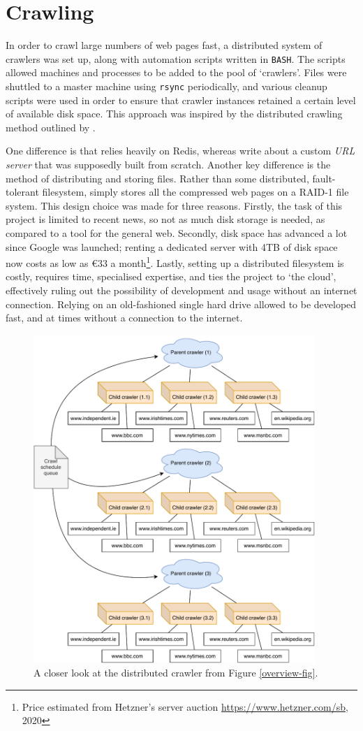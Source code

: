 \section{Crawling\label{crawling}}
In order to crawl large numbers of web pages fast, a
distributed system of crawlers was set up, along with
automation scripts written in {\tt BASH}. The scripts allowed
machines and processes to be added to the pool of `crawlers'.  Files
were shuttled to a master machine using {\tt rsync} periodically,
and various cleanup scripts were used in order to ensure that crawler
instances retained a certain level of available disk space.  This
approach was inspired by the distributed crawling method outlined by
.

One difference is that
\nr{} relies heavily on Redis, whereas \citeauthor{page1998} write
about a custom {\it URL server} that was supposedly built from scratch.
Another key difference is
the method of distributing and storing files.  Rather than some
distributed, fault-tolerant filesystem, \nr{} simply stores all the
compressed web pages on a RAID-1 file system.  This design
choice was made for three reasons.  Firstly, the task of this
project is limited to recent news, so not as much disk storage is
needed, as compared to a tool for the general web.  Secondly,
disk space has advanced a lot since Google was launched;
renting a dedicated server with 4TB of disk space now costs
as low as €33 a month\footnote{Price estimated from Hetzner's server auction \url{https://www.hetzner.com/sb}, 2020}.  Lastly, setting up a distributed filesystem
is costly, requires time, specialised expertise, and ties the
project to `the cloud', effectively ruling out the possibility of
development and usage without an internet connection.
Relying on an
old-fashioned single hard drive allowed \nr{} to be developed fast,
and at times without a connection to the internet.

\begin{figure}
    \centering
    \includegraphics[width=0.95\textwidth]{media/crawler.pdf}
    \caption{
        A closer look at the distributed crawler from
        Figure \ref{overview-fig}.
    }
\end{figure}